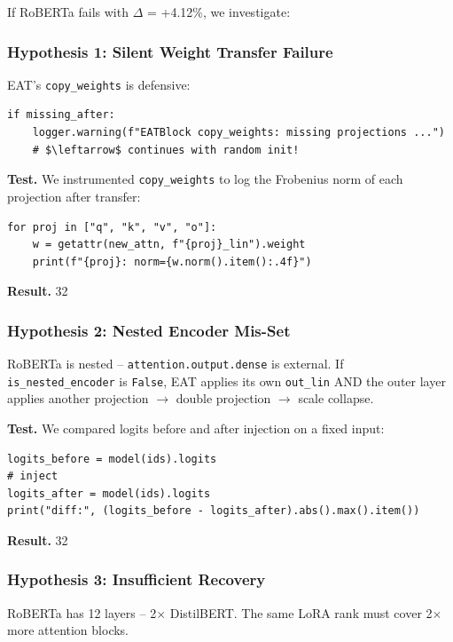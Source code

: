 If RoBERTa fails with $\Delta$ = +4.12\%, we investigate:

\subsubsection{Hypothesis 1: Silent Weight Transfer Failure}

EAT's \texttt{copy\_weights} is defensive:

\begin{lstlisting}
if missing_after:
    logger.warning(f"EATBlock copy_weights: missing projections ...")
    # $\leftarrow$ continues with random init!
\end{lstlisting}

\textbf{Test.} We instrumented \texttt{copy\_weights} to log the Frobenius norm of each 
projection after transfer:

\begin{lstlisting}
for proj in ["q", "k", "v", "o"]:
    w = getattr(new_attn, f"{proj}_lin").weight
    print(f"{proj}: norm={w.norm().item():.4f}")
\end{lstlisting}

\textbf{Result.} 32

\subsubsection{Hypothesis 2: Nested Encoder Mis-Set}

RoBERTa is nested -- \texttt{attention.output.dense} is external. If 
\texttt{is\_nested\_encoder} is \texttt{False}, EAT applies its own \texttt{out\_lin} AND the 
outer layer applies another projection $\to$ double projection $\to$ scale collapse.

\textbf{Test.} We compared logits before and after injection on a fixed input:

\begin{lstlisting}
logits_before = model(ids).logits
# inject
logits_after = model(ids).logits
print("diff:", (logits_before - logits_after).abs().max().item())
\end{lstlisting}

\textbf{Result.} 32

\subsubsection{Hypothesis 3: Insufficient Recovery}

RoBERTa has 12 layers -- 2$\times$ DistilBERT. The same LoRA rank must cover 
2$\times$ more attention blocks.

